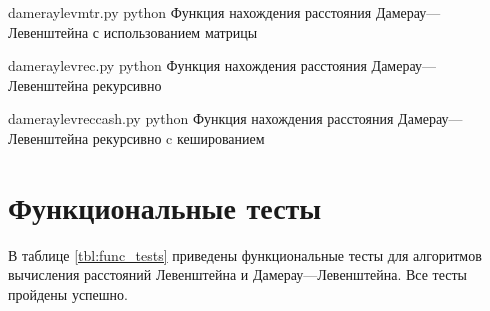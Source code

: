 \clearpage

{dameraylevmtr.py} %
{python} %
{Функция нахождения расстояния Дамерау---Левенштейна с использованием матрицы} %

\clearpage

{dameraylevrec.py} %
{python} %
{Функция нахождения расстояния Дамерау---Левенштейна рекурсивно} %

\clearpage

{dameraylevreccash.py} %
{python} %
{Функция нахождения расстояния Дамерау---Левенштейна рекурсивно c кешированием} %

\clearpage


\section{Функциональные тесты}

В таблице \ref{tbl:func_tests} приведены функциональные тесты для алгоритмов вычисления расстояний Левенштейна и Дамерау---Левенштейна. Все тесты пройдены успешно.

